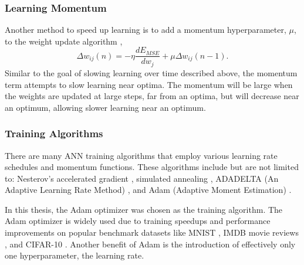 \subsubsection{Learning Momentum}

Another method to speed up learning is to add a momentum hyperparameter, $\mu$, to the weight update algorithm \cite{Yu1997}, 
%
\begin{equation} \label{eq:update_momentum}
\Delta w_{ij}(n) = - \eta \frac{dE_{MSE}}{dw_j} +\mu \Delta w_{ij}(n-1).
\end{equation}
%
Similar to the goal of slowing learning over time described above, the momentum term attempts to slow learning near optima. The momentum will be large when the weights are updated at large steps, far from an optima, but will decrease near an optimum, allowing slower learning near an optimum. 
 
\subsubsection{Training Algorithms} \label{section_training_algs}

There are many ANN training algorithms that employ various learning rate schedules and momentum functions. These algorithms include but are not limited to: Nesterov's accelerated gradient \cite{nesterov1983}, simulated annealing \cite{Kirkpatrick1983}, ADADELTA (An Adaptive Learning Rate Method) \cite{ADADELTA}, and Adam (Adaptive Moment Estimation) \cite{Kingma2015}. 

In this thesis, the Adam optimizer was chosen as the training algorithm. The Adam optimizer is widely used due to training speedups and performance improvements on popular benchmark datasets like MNIST \cite{lecun98}, IMDB movie reviews \cite{Maas2011}, and CIFAR-10 \cite{Krizhevsky2009}. Another benefit of Adam is the introduction of effectively only one hyperparameter, the learning rate.

